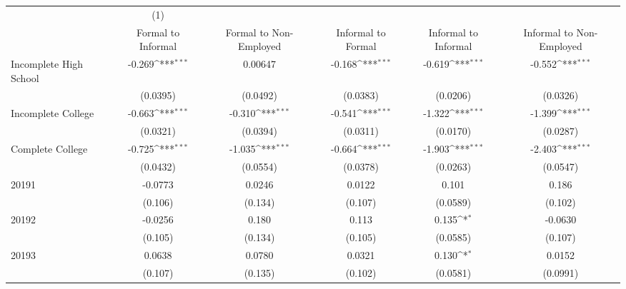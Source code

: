 {
\def\sym#1{\ifmmode^{#1}\else\(^{#1}\)\fi}
\begin{tabular}{l*{5}{c}}
\hline\hline
                    &\multicolumn{1}{c}{(1)}         &                     &                     &                     &                     \\
                    &Formal to Informal         &Formal to Non-Employed         &Informal to Formal         &Informal to Informal         &Informal to Non-Employed         \\
\hline
Incomplete High School&      -0.269\sym{***}&     0.00647         &      -0.168\sym{***}&      -0.619\sym{***}&      -0.552\sym{***}\\
                    &    (0.0395)         &    (0.0492)         &    (0.0383)         &    (0.0206)         &    (0.0326)         \\
[1em]
Incomplete College  &      -0.663\sym{***}&      -0.310\sym{***}&      -0.541\sym{***}&      -1.322\sym{***}&      -1.399\sym{***}\\
                    &    (0.0321)         &    (0.0394)         &    (0.0311)         &    (0.0170)         &    (0.0287)         \\
[1em]
Complete College    &      -0.725\sym{***}&      -1.035\sym{***}&      -0.664\sym{***}&      -1.903\sym{***}&      -2.403\sym{***}\\
                    &    (0.0432)         &    (0.0554)         &    (0.0378)         &    (0.0263)         &    (0.0547)         \\
[1em]
20191               &     -0.0773         &      0.0246         &      0.0122         &       0.101         &       0.186         \\
                    &     (0.106)         &     (0.134)         &     (0.107)         &    (0.0589)         &     (0.102)         \\
[1em]
20192               &     -0.0256         &       0.180         &       0.113         &       0.135\sym{*}  &     -0.0630         \\
                    &     (0.105)         &     (0.134)         &     (0.105)         &    (0.0585)         &     (0.107)         \\
[1em]
20193               &      0.0638         &      0.0780         &      0.0321         &       0.130\sym{*}  &      0.0152         \\
                    &     (0.107)         &     (0.135)         &     (0.102)         &    (0.0581)         &    (0.0991)         \\

\end{tabular}}
